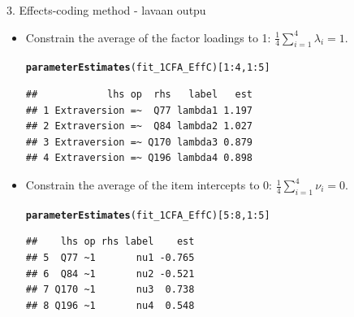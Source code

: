 \documentclass[10pt]{beamer}\usepackage[]{graphicx}\usepackage[]{xcolor}
\makeatletter
\newcommand{\hlnum}[1]{\textcolor[rgb]{0.686,0.059,0.569}{#1}}%
\newcommand{\hlopt}[1]{\textcolor[rgb]{0,0,0}{#1}}%
\newcommand{\hlstd}[1]{\textcolor[rgb]{0.345,0.345,0.345}{#1}}%
\newcommand{\hlkwd}[1]{\textcolor[rgb]{0.737,0.353,0.396}{\textbf{#1}}}%
\newenvironment{kframe}{%
 \def\at@end@of@kframe{}%
 \ifinner\ifhmode%
  \def\at@end@of@kframe{\end{minipage}}%
  \begin{minipage}{\columnwidth}%
 \fi\fi%
 \def\FrameCommand##1{\hskip\@totalleftmargin \hskip-\fboxsep
 \colorbox{shadecolor}{##1}\hskip-\fboxsep
     \hskip-\linewidth \hskip-\@totalleftmargin \hskip\columnwidth}%
 \MakeFramed {\advance\hsize-\width
   \@totalleftmargin\z@ \linewidth\hsize
   \@setminipage}}%
 {\par\unskip\endMakeFramed%
 \at@end@of@kframe}
\newenvironment{knitrout}{}{} %
\makeatother
\begin{document}
%
\begin{frame}[fragile]{3. Effects-coding method - lavaan outpu}

\begin{itemize}
    \item Constrain the average of the factor loadings to 1:
    $\frac{1}{4} \sum_{i=1}^4 \lambda_i = 1$. \\ %
\begin{knitrout}
\color{fgcolor}\begin{kframe}
\begin{alltt}
\hlkwd{parameterEstimates}\hlstd{(fit_1CFA_EffC)[}\hlnum{1}\hlopt{:}\hlnum{4}\hlstd{,}\hlnum{1}\hlopt{:}\hlnum{5}\hlstd{]}
\end{alltt}
\begin{verbatim}
##            lhs op  rhs   label   est
## 1 Extraversion =~  Q77 lambda1 1.197
## 2 Extraversion =~  Q84 lambda2 1.027
## 3 Extraversion =~ Q170 lambda3 0.879
## 4 Extraversion =~ Q196 lambda4 0.898
\end{verbatim}
\end{kframe}
\end{knitrout}
    \item Constrain the average of the item intercepts to 0:
    $\frac{1}{4} \sum_{i=1}^4 \nu_i = 0$.\\
\begin{knitrout}
\color{fgcolor}\begin{kframe}
\begin{alltt}
\hlkwd{parameterEstimates}\hlstd{(fit_1CFA_EffC)[}\hlnum{5}\hlopt{:}\hlnum{8}\hlstd{,}\hlnum{1}\hlopt{:}\hlnum{5}\hlstd{]}
\end{alltt}
\begin{verbatim}
##    lhs op rhs label    est
## 5  Q77 ~1       nu1 -0.765
## 6  Q84 ~1       nu2 -0.521
## 7 Q170 ~1       nu3  0.738
## 8 Q196 ~1       nu4  0.548
\end{verbatim}
\end{kframe}
\end{knitrout}
\end{itemize}

\end{frame}
%
\end{document}
